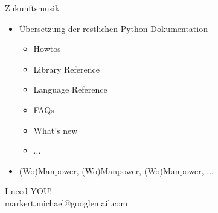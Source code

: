 \documentclass{beamer}
\begin{document}
\begin{frame}{Zukunftsmusik}
  \begin{itemize}
  \item Übersetzung der restlichen Python Dokumentation
    \begin{itemize}
    \item Howtos
    \item Library Reference
    \item Language Reference
    \item FAQs
    \item What's new
    \item ...
    \end{itemize}
  \item (Wo)Manpower, (Wo)Manpower, (Wo)Manpower, ...
  \end{itemize}
\end{frame}
\begin{frame}{}
  \begin{center}
    \Huge{I need YOU!}
    \\
    \vspace{2cm}
    \huge{markert.michael@googlemail.com}
  \end{center}
\end{frame}
\end{document}
